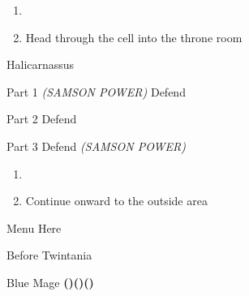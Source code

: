 \begin{paracol}{2}
\begin{enumerate}[resume]
    \item {}
    \item Head through the cell into the throne room
\end{enumerate}

\begin{boss}{Halicarnassus}
    \varwb
    \begin{notes}
        \item {}
    \end{notes}
    \begin{bossPart}{Part 1}
        \bartz[\bossHl{(3x)}] \rightCommand{\combine} \then \battleGroup{\revivify \space + \antidote} \textit{(SAMSON POWER)} \then {}
        \faris[\bossHl{(1x)}] \leftCommand{\drink} \then \heroDrink
        \cara[\bossHl{(1x)}] Defend
         \leftCommand{\guard}
        \faris[\bossHl{(2x)}] \rightCommand{\gilToss}
    \end{bossPart}
    \begin{bossPart}{Part 2}
        \cara[\bossHl{(1x)}] \rightCommand{\gilToss}
        \bartz Defend
        \faris[\bossHl{(1x)}] \rightCommand{\gilToss}
    \end{bossPart}
    \begin{bossPart}{Part 3}
        \cara Defend
        \bartz[\bossHl{(1x)}] \rightCommand{\combine} \then \battleGroup{\revivify \space + \antidote} \textit{(SAMSON POWER)} \then {}
        \faris[\bossHl{(1x)}] \rightCommand{\gilToss}
    \end{bossPart}
    \varwe
\end{boss}

\begin{enumerate}[resume]
    \item {}
    \item Continue onward to the outside area
\end{enumerate}

\switchcolumn
\begin{misc}{Menu Here}
\end{misc}

\switchcolumn
\begin{menu}{Before Twintania}
    \varwb
    \begin{itemMenu}
        \maidensKissMenu {}
    \end{itemMenu}
    \begin{abilityMenu}
        \bartz {} \optimize
    \end{abilityMenu}
    \begin{jobMenu}
        \lenna Blue Mage \textbf{(\pointDown)(\pointLeft)(\pointDown)}
    \end{jobMenu}
    \varwe
\end{menu}


\end{paracol}
